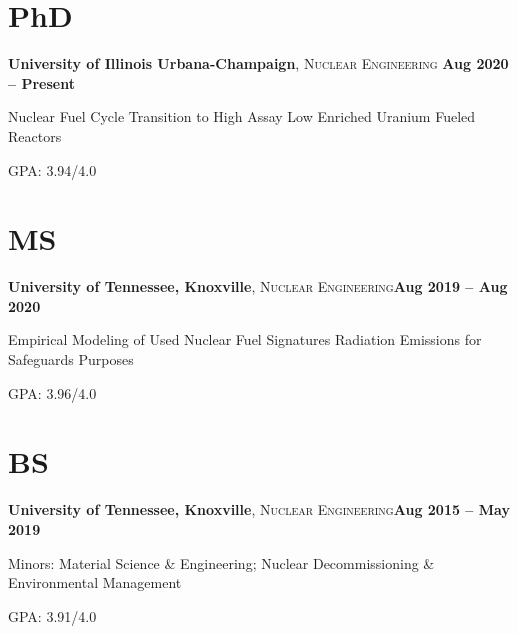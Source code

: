\documentclass[margin,line]{resume}
\begin{document}
\begin{resume}
    \section{\mysidestyle PhD}
    \textbf{University of Illinois Urbana-Champaign}, \textsc{Nuclear Engineering}\hfill \textbf{ Aug 2020 -- Present}\vspace{-3mm}\\\vspace{-1mm}%
    \begin{list2}
        \item Nuclear Fuel Cycle Transition to High Assay Low Enriched Uranium Fueled Reactors
        \item GPA: 3.94/4.0
    \end{list2}\vspace{-4mm}
    \section{\mysidestyle MS}
    \textbf{University of Tennessee, Knoxville}, \textsc{Nuclear Engineering}\hfill\textbf{Aug 2019 -- Aug 2020}\vspace{-3mm}\\\vspace{-1mm}%
    \begin{list2}
        \item Empirical Modeling of Used Nuclear Fuel Signatures Radiation Emissions for Safeguards Purposes
        \item GPA: 3.96/4.0
    \end{list2}\vspace{-4mm}
    \section{\mysidestyle BS}
    \textbf{University of Tennessee, Knoxville}, \textsc{Nuclear Engineering}\hfill\textbf{Aug 2015 -- May 2019}\vspace{-3mm}\\\vspace{-1mm}%
    \begin{list2}
        \item Minors: Material Science \& Engineering; Nuclear Decommissioning \& 
              Environmental Management
        \item GPA: 3.91/4.0
    \end{list2}\vspace{-2mm}
    

\end{resume}
\end{document}
